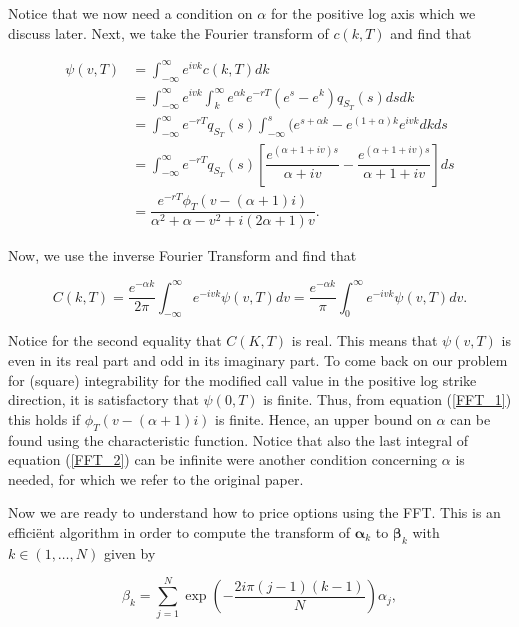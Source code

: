 \documentclass[12pt,a4paper,oneside]{book}
\begin{document}
Notice that we now need a condition on $\alpha$ for the positive log axis which we discuss later. Next, we take the Fourier transform of $c(k,T)$ and find that 

\begin{align}\label{FFT_1}
\psi(v,T) &= \int_{-\infty}^{\infty} e^{ivk} c(k,T) dk \nonumber  \\
		  &= \int_{-\infty}^{\infty} e^{ivk} \int_{k}^{\infty} e^{\alpha k} e^{-rT} (e^s - e^k) q_{S_T}(s) ds dk \nonumber \\
		  &= \int_{-\infty}^{\infty} e^{-rT} q_{S_T}(s) \int_{-\infty}^{s} (e^{s+\alpha k} - e^{(1+\alpha)k} e^{ivk} dk ds \nonumber \\
		  &= \int_{-\infty}^{\infty} e^{-rT} q_{S_T}(s) \left[\dfrac{e^{(\alpha+1+iv)s}}{\alpha+iv} - \dfrac{e^{(\alpha+1+iv)s}}{\alpha+1+iv}\right] ds \nonumber \\
		  &= \dfrac{e^{-rT} \phi_{T}(v- (\alpha+1)i)}{\alpha^2 + \alpha -v^2 + i(2\alpha+1)v}.
\end{align}

Now, we use the inverse Fourier Transform and find that

\begin{equation}\label{FFT_2}
C(k,T) = \dfrac{e^{-\alpha k}}{2 \pi}\int_{-\infty}^{\infty} e^{-ivk} \psi(v,T) dv = \dfrac{e^{-\alpha k}}{ \pi}\int_{0}^{\infty} e^{-ivk} \psi(v,T) dv.
\end{equation}

Notice for the second equality that $C(K,T)$ is real. This means that $\psi(v,T)$ is even in its real part and odd in its imaginary part. To come back on our problem for (square) integrability for the modified call value in the positive log strike direction, it is satisfactory that $\psi(0,T)$ is finite. Thus, from equation (\ref{FFT_1}) this holds if $\phi_{T}(v- (\alpha+1)i)$ is finite. Hence, an upper bound on $\alpha$ can be found using the characteristic function. Notice that also the last integral of equation (\ref{FFT_2}) can be infinite were another condition concerning $\alpha$ is needed, for which we refer to the original paper. 

Now we are ready to understand how to price options using the FFT. This is an effici\"{e}nt algorithm in order to compute the transform of $\bm{\alpha}_k$ to $\bm{\beta}_k$ with $k \in (1,\ldots,N)$ given by

\begin{equation}\label{FFT_5}
\beta_k = \sum\limits_{j=1}^{N} \exp \left( -\dfrac{2i\pi(j-1)(k-1)}{N}\right)\alpha_j,
\end{equation}
\end{document}
